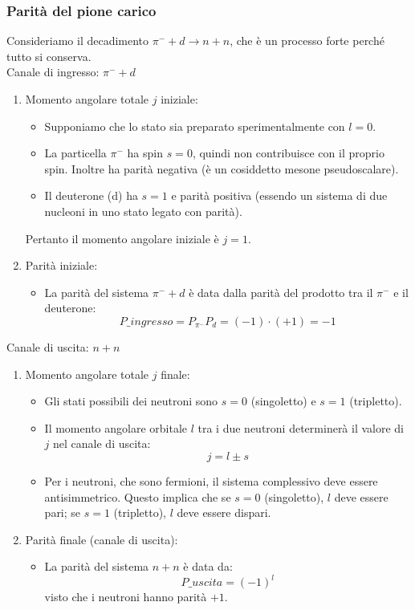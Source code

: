 \subsubsection{Parità del pione carico}
Consideriamo il decadimento $\pi^-+d\to n+n$, che è un processo forte perché tutto si conserva.\\
Canale di ingresso: $\pi^-+d$
\begin{enumerate}
    \item Momento angolare totale $j$ iniziale:
    \begin{itemize}
        \item Supponiamo che lo stato sia preparato sperimentalmente con $l=0$.
        \item La particella $\pi^-$ ha spin $s=0$, quindi non contribuisce con il proprio spin. Inoltre ha parità negativa (è un cosiddetto mesone pseudoscalare).
        \item Il deuterone (d) ha $s=1$ e parità positiva (essendo un sistema di due nucleoni in uno stato legato con parità).
    \end{itemize}
    Pertanto il momento angolare iniziale è $j=1$. 
    \item Parità iniziale:
    \begin{itemize}
        \item La parità del sistema $\pi^-+d$ è data dalla parità del prodotto tra il $\pi^-$ e il deuterone:
        \begin{equation*}
        P\_{ingresso}=P_{\pi^-}P_d=(-1)\cdot (+1)= -1
        \end{equation*}
    \end{itemize}
\end{enumerate}
Canale di uscita: $n+n$
\begin{enumerate}
    \item Momento angolare totale $j$ finale:
    \begin{itemize}
        \item Gli stati possibili dei neutroni sono $s=0$ (singoletto) e $s=1$ (tripletto).
        \item Il momento angolare orbitale $l$ tra i due neutroni determinerà il valore di $j$ nel canale di uscita:
        \begin{equation*}
        j=l\pm s
        \end{equation*}
        \item Per i neutroni, che sono fermioni, il sistema complessivo deve essere antisimmetrico. Questo implica che se $s=0$ (singoletto), $l$ deve essere pari; se $s=1$ (tripletto), $l$ deve essere dispari.
    \end{itemize} 
    \item Parità finale (canale di uscita):
    \begin{itemize}
        \item La parità del sistema $n+n$ è data da:
        \begin{equation*}
        P\_{uscita}=(-1)^l
        \end{equation*}
        visto che i neutroni hanno parità $+1$.
    \end{itemize}
\end{enumerate}
